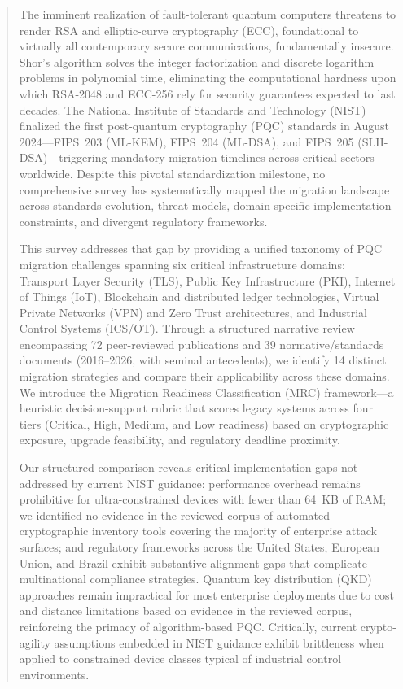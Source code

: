 \documentclass[journal]{IEEEtran}
\begin{document}
\begin{abstract}
The imminent realization of fault-tolerant quantum computers threatens to render
RSA and elliptic-curve cryptography (ECC), foundational to virtually all
contemporary secure communications, fundamentally insecure. Shor's algorithm
solves the integer factorization and discrete logarithm problems in polynomial
time, eliminating the computational hardness upon which RSA-2048 and ECC-256
rely for security guarantees expected to last decades. The National Institute of
Standards and Technology (NIST) finalized the first post-quantum cryptography
(PQC) standards in August 2024---FIPS~203 (ML-KEM), FIPS~204 (ML-DSA), and
FIPS~205 (SLH-DSA)---triggering mandatory migration timelines across critical
sectors worldwide. Despite this pivotal standardization milestone, no
comprehensive survey has systematically mapped the migration landscape across
standards evolution, threat models, domain-specific implementation constraints,
and divergent regulatory frameworks.

This survey addresses that gap by providing a unified taxonomy of PQC
migration challenges spanning six critical infrastructure domains: Transport
Layer Security (TLS), Public Key Infrastructure (PKI), Internet of Things (IoT),
Blockchain and distributed ledger technologies, Virtual Private Networks (VPN)
and Zero Trust architectures, and Industrial Control Systems (ICS/OT). Through
a structured narrative review encompassing 72 peer-reviewed
publications and 39 normative/standards documents (2016--2026, with seminal
antecedents), we identify 14 distinct migration strategies and compare their
applicability across these domains. We introduce the Migration
Readiness Classification (MRC) framework---a heuristic decision-support rubric
that scores legacy systems across four tiers
(Critical, High, Medium, and Low readiness) based on cryptographic exposure,
upgrade feasibility, and regulatory deadline proximity.

Our structured comparison reveals critical implementation gaps not addressed by
current NIST guidance: performance overhead remains prohibitive for ultra-constrained
devices with fewer than 64~KB of RAM; we identified no evidence in the reviewed
corpus of automated cryptographic inventory tools covering the majority of
enterprise attack surfaces; and regulatory frameworks
across the United States, European Union, and Brazil exhibit substantive alignment
gaps that complicate multinational compliance strategies. Quantum key distribution
(QKD) approaches remain impractical for most enterprise deployments due to cost
and distance limitations based on evidence in the reviewed corpus,
reinforcing the primacy of algorithm-based PQC.
Critically, current crypto-agility assumptions embedded in NIST guidance exhibit
brittleness when applied to constrained device classes typical of industrial
control environments.


\end{abstract}
\end{document}
